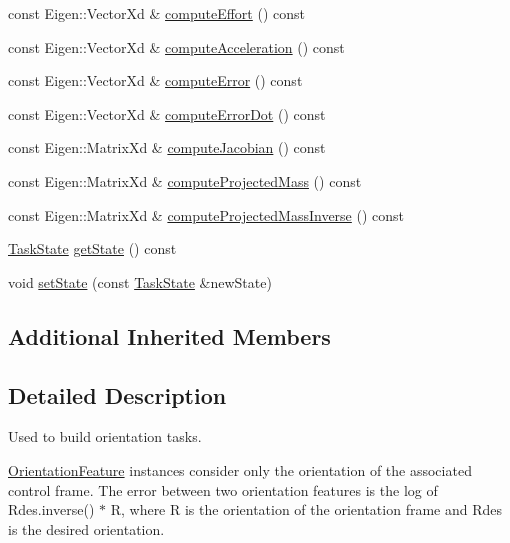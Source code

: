 \begin{DoxyCompactItemize}
const Eigen\+::\+Vector\+Xd \& \hyperlink{classocra_1_1OrientationFeature_aa2d2bee82d7c9bef9f565e328204a2f2}{compute\+Effort} () const
\item 
const Eigen\+::\+Vector\+Xd \& \hyperlink{classocra_1_1OrientationFeature_a948340f06a913d3c56fb306f65c3ad81}{compute\+Acceleration} () const
\item 
const Eigen\+::\+Vector\+Xd \& \hyperlink{classocra_1_1OrientationFeature_a0663495ff0bd6a9b01330ce4372b56ab}{compute\+Error} () const
\item 
const Eigen\+::\+Vector\+Xd \& \hyperlink{classocra_1_1OrientationFeature_abf35648fec0b8744710cfd9da704cbbf}{compute\+Error\+Dot} () const
\item 
const Eigen\+::\+Matrix\+Xd \& \hyperlink{classocra_1_1OrientationFeature_abcbc478b32843cc055c3b7002ce91e7c}{compute\+Jacobian} () const
\item 
const Eigen\+::\+Matrix\+Xd \& \hyperlink{classocra_1_1OrientationFeature_a6db043f4cce0767fe530c2e14aa9f48a}{compute\+Projected\+Mass} () const
\item 
const Eigen\+::\+Matrix\+Xd \& \hyperlink{classocra_1_1OrientationFeature_a56caa1399bd0f474a91da570c8be57bb}{compute\+Projected\+Mass\+Inverse} () const
\item 
\hyperlink{classocra_1_1TaskState}{Task\+State} \hyperlink{classocra_1_1OrientationFeature_a586d036d6676d9ff17d33db2dcc11cae}{get\+State} () const
\item 
void \hyperlink{classocra_1_1OrientationFeature_a2a3b8eb5334d6dcd8f3b2fc40aac46ad}{set\+State} (const \hyperlink{classocra_1_1TaskState}{Task\+State} \&new\+State)
\end{DoxyCompactItemize}
\subsection*{Additional Inherited Members}


\subsection{Detailed Description}
Used to build orientation tasks. 

\hyperlink{classocra_1_1OrientationFeature}{Orientation\+Feature} instances consider only the orientation of the associated control frame. The error between two orientation features is the log of Rdes.\+inverse() $\ast$ R, where R is the orientation of the orientation frame and Rdes is the desired orientation. 


